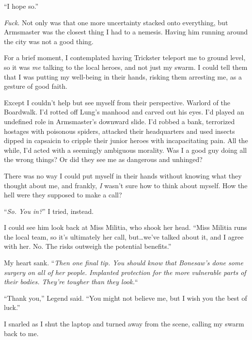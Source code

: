 ``I hope so.''



\emph{Fuck}.  Not only was that one more uncertainty stacked onto everything, but Armsmaster was the closest thing I had to a nemesis.  Having him running around the city was not a good thing.



For a brief moment, I contemplated having Trickster teleport me to ground level, so it was \emph{me} talking to the local heroes, and not just my swarm.  I could tell them that I was putting my well-being in their hands, risking them arresting me, as a gesture of good faith.



Except I couldn't help but see myself from their perspective.  Warlord of the Boardwalk.  I'd rotted off Lung's manhood and carved out his eyes.  I'd played an undefined role in Armsmaster's downward slide.  I'd robbed a bank, terrorized hostages with poisonous spiders, attacked their headquarters and used insects dipped in capsaicin to cripple their junior heroes with incapacitating pain.  All the while, I'd acted with a seemingly ambiguous morality.  Was I a good guy doing all the wrong things?  Or did they see me as dangerous and unhinged?



There was no way I could put myself in their hands without knowing what they thought about me, and frankly, \emph{I} wasn't sure how to think about myself.  How the hell were they supposed to make a call?



``\emph{So.  You in?}''  I tried, instead.



I could see him look back at Miss Militia, who shook her head.  ``Miss Militia runs the local team, so it's ultimately her call, but\ldots we've talked about it, and I agree with her.  No.  The risks outweigh the potential benefits.''



My heart sank.  ``\emph{Then one final tip.  You should know that Bonesaw's done some surgery on all of her people.  Implanted protection for the more vulnerable parts of their bodies.  They're tougher than they look.}``



``Thank you,'' Legend said.  ``You might not believe me, but I wish you the best of luck.''



I snarled as I shut the laptop and turned away from the scene, calling my swarm back to me.



